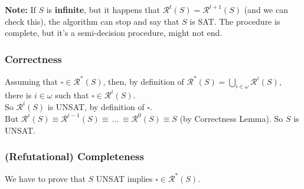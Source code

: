 \textbf{Note:} If $S$ is \textbf{infinite}, but it happens that $\mathcal{R}^t (S) = \mathcal{R}^{t+1} (S)$ (and we can check this), the algorithm can stop and say that $S$ is SAT. The procedure is complete, but it's a semi-decision procedure, might not end.\\



%

\subsubsection{Correctness}
Assuming that $\square \in \mathcal{R}^\ast (S)$, then, by definition of $\mathcal{R}^\ast (S) = \bigcup_{i \in \omega} \mathcal{R}^i (S)$, there is $i \in \omega$ such that $\square \in \mathcal{R}^i (S)$.\\

So $\mathcal{R}^i (S)$ is UNSAT, by definition of $\square$.\\
But $\mathcal{R}^i (S) \equiv \mathcal{R}^{i-1} (S) \equiv \, \dots \, \equiv \mathcal{R}^0 (S) \equiv S$ (by Correctness Lemma). So $S$ is UNSAT.\\

\newpage

\subsubsection{(Refutational) Completeness}
We have to prove that $S$ UNSAT implies $\square \in \mathcal{R}^\ast (S)$.\\

